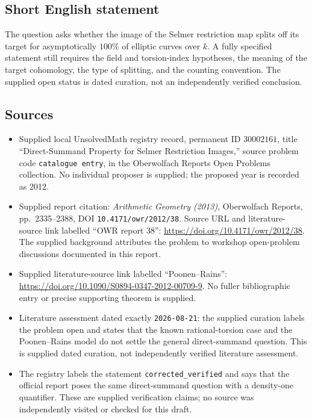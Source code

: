 \documentclass[11pt]{article}
\begin{document}
\subsection{Short English statement}
The question asks whether the image of the Selmer restriction map splits off its target for asymptotically \(100\%\) of elliptic curves over \(k\). A fully specified statement still requires the field and torsion-index hypotheses, the meaning of the target cohomology, the type of splitting, and the counting convention. The supplied open status is dated curation, not an independently verified conclusion.
\subsection{Sources}
\begin{itemize}
\item Supplied local UnsolvedMath registry record, permanent ID \(30002161\), title ``Direct-Summand Property for Selmer Restriction Images,'' source problem code \texttt{catalogue entry}, in the Oberwolfach Reports Open Problems collection. No individual proposer is supplied; the proposed year is recorded as 2012.
\item Supplied report citation: \emph{Arithmetic Geometry (2013)}, Oberwolfach Reports, pp.\ 2335--2388, DOI \texttt{10.4171/owr/2012/38}. Source URL and literature-source link labelled ``OWR report 38'': \url{https://doi.org/10.4171/owr/2012/38}. The supplied background attributes the problem to workshop open-problem discussions documented in this report.
\item Supplied literature-source link labelled ``Poonen--Rains'': \url{https://doi.org/10.1090/S0894-0347-2012-00709-9}. No fuller bibliographic entry or precise supporting theorem is supplied.
\item Literature assessment dated exactly \texttt{2026-08-21}: the supplied curation labels the problem open and states that the known rational-torsion case and the Poonen--Rains model do not settle the general direct-summand question. This is supplied dated curation, not independently verified literature assessment.
\item The registry labels the statement \texttt{corrected\_verified} and says that the official report poses the same direct-summand question with a density-one quantifier. These are supplied verification claims; no source was independently visited or checked for this draft.
\end{itemize}
\end{document}
